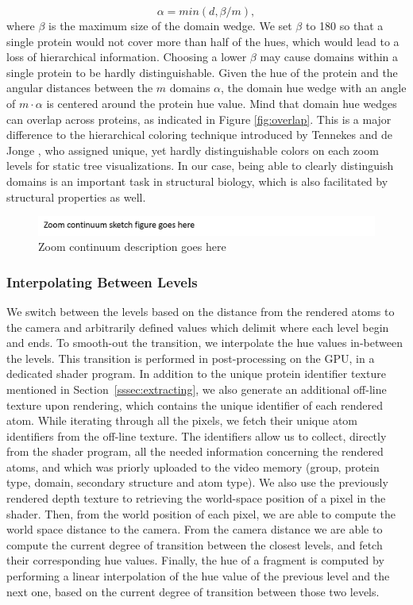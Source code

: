 \documentclass[review,journal]{vgtc}         %
\begin{document}
	\[
	\alpha = min(d, \beta / m),
	\]
	where $\beta$ is the maximum size of the domain wedge. 
	We set $\beta$ to 180 so that a single protein would not cover more than half of the hues, which would lead to a loss of hierarchical information. 
	Choosing a lower $\beta$ may cause domains within a single protein to be hardly distinguishable.  
	Given the hue of the protein and the angular distances between the $m$ domains $\alpha$, the domain hue wedge with an angle of $m \cdot \alpha$ is centered around the protein hue value.
	Mind that domain hue wedges can overlap across proteins, as indicated in Figure \ref{fig:overlap}. 
	This is a major difference to the hierarchical coloring technique introduced by Tennekes and de Jonge \cite{tennekes2014tree}, who assigned unique, yet hardly distinguishable colors on each zoom levels for static tree visualizations. 
	In our case, being able to clearly distinguish domains is an important task in structural biology, which is also facilitated by structural properties as well. 
		
	\begin{figure}
		\centering
		\includegraphics[width=1\linewidth]{Figures/placeholder}
		\caption{Zoom continuum description goes here}
		\label{fig:zoom_continuum}
	\end{figure}
	
	\subsubsection{Interpolating Between Levels}
	
	We switch between the levels based on the distance from the rendered atoms to the camera and arbitrarily defined values which delimit where each level begin and ends.
	To smooth-out the transition, we interpolate the hue values in-between the levels.	
	This transition is performed in post-processing on the GPU, in a dedicated shader program.
	In addition to the unique protein identifier texture mentioned in Section~\ref{sssec:extracting}, we also generate an additional off-line texture upon rendering, which contains the unique identifier of each rendered atom.
	While iterating through all the pixels, we fetch their unique atom identifiers from the off-line texture.
	The identifiers allow us to collect, directly from the shader program, all the needed information concerning the rendered atoms, and which was priorly uploaded to the video memory (group, protein type, domain, secondary structure and atom type).	
	We also use the previously rendered depth texture to retrieving the world-space position of a pixel in the shader.
	Then, from the world position of each pixel, we are able to compute the world space distance to the camera.
	From the camera distance we are able to compute the current degree of transition between the closest levels, and fetch their corresponding hue values.	
	Finally, the hue of a fragment is computed by performing a linear interpolation of the hue value of the previous level and the next one, based on the current degree of transition between those two levels.
	
\end{document}
